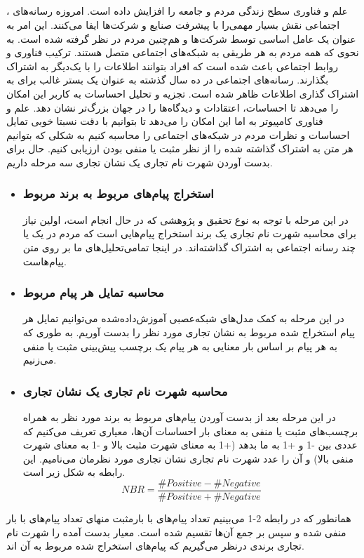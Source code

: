 \subsection{}
، علم و فناوری سطح زندگی مردم و جامعه را افزایش داده است. امروزه رسانه‌های اجتماعی نقش بسیار مهمی‌را با پیشرفت صنایع و شرکت‌ها ایفا می‌کنند. این امر به عنوان یک عامل اساسی توسط شرکت‌ها و هم‌چنین مردم در نظر گرفته شده است. به نحوی که همه مردم به هر طریقی به شبکه‌های اجتماعی متصل هستند. ترکیب فناوری و روابط اجتماعی باعث شده است که افراد بتوانند اطلاعات را با یک‌دیگر به اشتراک بگذارند. رسانه‌های اجتماعی در ده سال گذشته به عنوان یک بستر غالب برای به اشتراک گذاری اطلاعات ظاهر شده است. تجزیه و تحلیل احساسات به کاربر این امکان را می‌دهد تا احساسات، اعتقادات و دیدگاه‌ها را در جهان بزرگ‌تر نشان دهد. علم و فناوری کامپیوتر به اما این امکان را می‌دهد تا بتوانیم با دقت نسبتا خوبی تمایل احساسات و نظرات مردم در شبکه‌های اجتماعی را محاسبه کنیم به شکلی که بتوانیم هر متن به اشتراک گذاشته شده را از نظر مثبت یا منفی بودن ارزیابی کنیم.
حال
برای بدست آوردن شهرت نام تجاری یک نشان تجاری سه مرحله داریم.
\begin{itemize}
\item \subsubsection{استخراج پیام‌های مربوط به برند مربوط}  در این مرحله با توجه به نوع تحقیق و پژوهشی که در حال انجام است، اولین نیاز برای محاسبه شهرت نام تجاری یک برند استخراج پیام‌هایی است که مردم در یک یا چند رسانه اجتماعی به اشتراک گذاشته‌اند. در اینجا تمامی‌تحلیل‌های ما بر روی متن پیام‌هاست.
\item \subsubsection{محاسبه تمایل هر پیام مربوط} در این مرحله به کمک مدل‌های شبکه‌عصبی آموزش‌داده‌شده می‌توانیم تمایل هر پیام استخراج شده مربوط به نشان تجاری مورد نظر را بدست آوریم. به طوری که به هر پیام بر اساس بار معنایی به هر پیام یک برچسب  پیش‌بینی مثبت یا منفی می‌زنیم.
\item \subsubsection{محاسبه شهرت نام تجاری یک نشان تجاری} در این مرحله بعد از بدست آوردن پیام‌های مربوط به برند مورد نظر به همراه برچسب‌های مثبت یا منفی به معنای بار احساسات آن‌ها، معیاری تعریف می‌کنیم که عددی بین -1 و +1 به ما بدهد (+1 به معنای شهرت مثبت بالا و -1 به معنای شهرت   منفی بالا) و آن را عدد شهرت نام تجاری نشان تجاری مورد نظرمان می‌نامیم. این رابطه به شکل زیر است. \\ \begin{equation}
NBR= \dfrac{\#Positive -\#Negative}{\#Positive + \#Negative}
\end{equation}
\end{itemize}
همانطور که در رابطه 2-1 می‌بینیم تعداد پیام‌های با بارمثبت منهای تعداد پیام‌های با بار منفی شده و سپس بر جمع آن‌ها تقسیم شده است. معیار بدست آمده  را شهرت نام تجاری برندی درنظر می‌گیریم که پیام‌های استخراج شده مربوط به آن اند.

